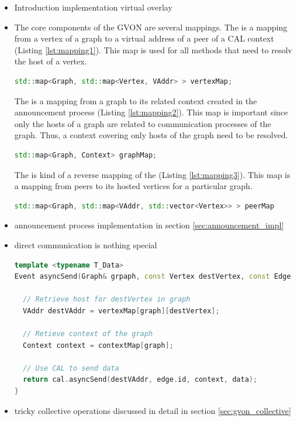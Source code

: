 \begin{itemize}
\item Introduction implementation virtual overlay

\item The core components of the GVON are several mappings.
  The  is a mapping from a vertex of a graph to
  a virtual address of a peer of a CAL context (Listing \ref{lst:mapping1}).
  This map is used for all methods that need to resolv the
  host of a vertex.
  
\begin{lstlisting}[language=C++, label=lst:mapping1]
  std::map<Graph, std::map<Vertex, VAddr> > vertexMap;
\end{lstlisting}

 The  is a mapping from a graph to its related context
 created in the announcement process (Listing
 \ref{lst:mapping2}). This map is important since only the hosts of a
 graph are related to communication processes of the graph. Thus, a
 context covering only hosts of the graph need to be resolved.

\begin{lstlisting}[language=C++, label=lst:mapping2]
  std::map<Graph, Context> graphMap;
\end{lstlisting}

 The  is kind of a reverse mapping of the 
 (Listing \ref{lst:mapping3}).  This map is a mapping from peers to
 its hosted vertices for a particular graph.

\begin{lstlisting}[language=C++, label=lst:mapping3]
  std::map<Graph, std::map<VAddr, std::vector<Vertex>> > peerMap 
\end{lstlisting}

\item announcement process implementation in section \ref{sec:announcement_impl}


\item direct communication is nothing special


\begin{lstlisting}[language=C++, label=lst:comm_gvon]
template <typename T_Data>
Event asyncSend(Graph& grpaph, const Vertex destVertex, const Edge edge, const T_Data& data){ 

  // Retrieve host for destVertex in graph
  VAddr destVAddr = vertexMap[graph][destVertex];

  // Retieve context of the graph
  Context context = contextMap[graph];

  // Use CAL to send data
  return cal.asyncSend(destVAddr, edge.id, context, data);
}
\end{lstlisting}

\item tricky collective operations discussed in detail in section \ref{sec:gvon_collective}
\end{itemize}

